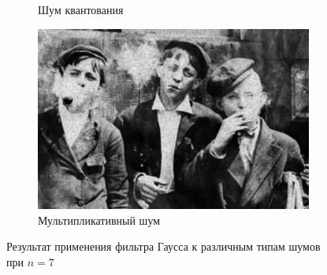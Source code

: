 \begin{figure}[ht!]
\begin{subfigure}[b]{0.5\linewidth}
      \caption{Шум квантования} 
      \label{gaussian_7:e}
    \end{subfigure}%
    \begin{subfigure}[b]{0.5\linewidth}
        \centering
        \includegraphics[width=0.95\linewidth]{../Gaussian_Blur/Gaussian_Blur_Speckle_noise_(7,7).jpg} 
        \caption{Мультипликативный шум} 
        \label{gaussian_7:f} 
    \end{subfigure} 
    \caption{Результат применения фильтра Гаусса к различным типам шумов при $n = 7$}
    \label{img:gaussian_7} 
  \end{figure}

